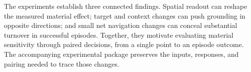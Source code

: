 The experiments establish three connected findings. Spatial readout can reshape
the measured material effect; target and context changes can push grounding in
opposite directions; and small net navigation changes can conceal substantial
turnover in successful episodes. Together, they motivate evaluating material
sensitivity through paired decisions, from a single point to an episode outcome.
The accompanying experimental package preserves the inputs, responses, and
pairing needed to trace those changes.
